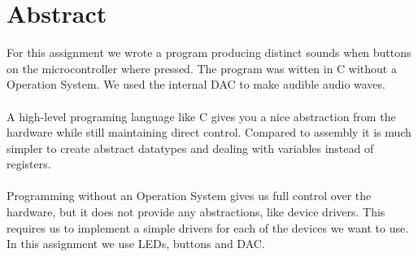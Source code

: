 \section{Abstract}
For this assignment we wrote a program producing distinct sounds when buttons on the microcontroller
where pressed. The program was witten in C without a Operation System. We used the internal DAC to
make audible audio waves.\\
\\
A high-level programing language like C gives you a nice abstraction from the hardware while still
maintaining direct control. Compared to assembly it is much simpler to create abstract datatypes and
dealing with variables instead of registers.\\
\\
Programming without an Operation System gives us full control over the hardware, but it does not
provide any abstractions, like device drivers. This requires us to implement a simple drivers for
each of the devices we want to use. In this assignment we use LEDs, buttons and DAC.
